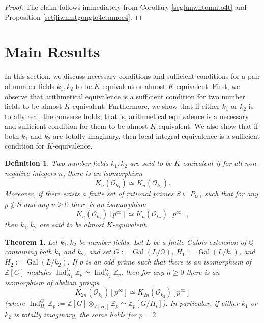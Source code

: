 \documentclass{article}
\numberwithin{equation}{section} %
\newtheorem{defi}[lemm]{Definition}
\newtheorem{them}[lemm]{Theorem}
\begin{document}
 \begin{proof}
     The claim follows immediately from Corollary \ref{segfunwntomnto4t} and Proposition \ref{setjfiwnmtgongto4etmnoe4}.
 \end{proof}


    \section{Main Results}


        In this section, we discuss necessary conditions and sufficient conditions for a pair of number fields $k_1, k_2$ to be $K$-equivalent or almost $K$-equivalent. First, we observe that arithmetical equivalence is a sufficient condition for two number fields to be almost $K$-equivalent. Furthermore, we show that if either $k_1$ or $k_2$ is totally real, the converse holds; that is, arithmetical equivalence is a necessary and sufficient condition for them to be almost $K$-equivalent. We also show that if both $k_1$ and $k_2$ are totally imaginary, then local integral equivalence is a sufficient condition for $K$-equivalence.
    
\begin{defi}
  Two number fields $k_1, k_2$ are said to be \textit{$K$-equivalent} if for all non-negative integers $n$, there is an isomorphism
  \[
    K_n(\mathcal{O}_{k_1}) \simeq K_n(\mathcal{O}_{k_2}).
  \]
  Moreover, if there exists a finite set of rational primes $S \subseteq P_{\mathbb{Q},\mathrm{f}}$ such that for any $p \notin S$ and any $n \geq 0$ there is an isomorphism
  \[
    K_n(\mathcal{O}_{k_1})[p^\infty] \simeq K_n(\mathcal{O}_{k_2})[p^\infty],
  \]
  then $k_1, k_2$ are said to be \textit{almost $K$-equivalent}.
\end{defi}

\begin{them}
  \label{hguhtuoiwntoir3}
  Let $k_1, k_2$ be number fields. Let $L$ be a finite Galois extension of $\mathbb{Q}$ containing both $k_1$ and $k_2$, and set $G := \operatorname{Gal}(L/\mathbb{Q})$, $H_1 := \operatorname{Gal}(L/k_1)$, and $H_2 := \operatorname{Gal}(L/k_2)$. If $p$ is an odd prime such that there is an isomorphism of $\mathbb{Z}[G]$-modules $\operatorname{Ind}_{H_1}^G \mathbb{Z}_p \simeq \operatorname{Ind}_{H_2}^G\mathbb{Z}_p$, then for any $n \geq 0$ there is an isomorphism of abelian groups
  \[
    K_{2n}(\mathcal{O}_{k_1})[p^\infty] \simeq K_{2n}(\mathcal{O}_{k_2})[p^\infty]
  \]
  (where $\operatorname{Ind}_{H_i}^G \mathbb{Z}_p := \mathbb{Z}[G] \otimes_{\mathbb{Z}[H_i]} \mathbb{Z}_p \simeq \mathbb{Z}_p[G/H_i]$). In particular, if either $k_1$ or $k_2$ is totally imaginary, the same holds for $p = 2$.
\end{them}
\end{document}
